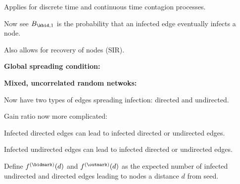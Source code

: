       Applies for discrete time and continuous time contagion
      processes.
    
      Now see $B_{\kbid,1}$ is the probability that an infected edge
      eventually infects a node.
    
      Also allows for recovery of nodes (SIR).
    

    
  



  \textbf{Global spreading condition:}

  \textbf{Mixed, uncorrelated random netwoks:}
  
   
    Now have two types of edges spreading infection: directed and undirected.
   
    Gain ratio now more complicated: 
    
     
      Infected directed edges can lead to infected directed or undirected edges.
     
      Infected undirected edges can lead to infected directed or undirected edges.
    
  
    Define 
    $
    f^{\textnormal{(\bidmark)}}(d)
    $
    and 
    $
    f^{\textnormal{(\outmark)}}(d)
    $
    as the expected number of infected undirected and directed 
    edges leading to nodes a distance $d$ from seed.
  
  


